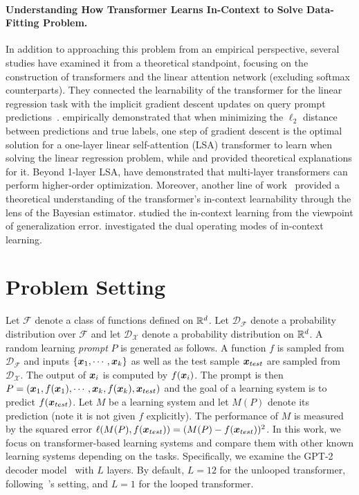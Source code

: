 \documentclass{article} %
\theoremstyle{plain}
\theoremstyle{definition}
\theoremstyle{remark}
\begin{document}
\paragraph{Understanding How Transformer Learns In-Context to Solve Data-Fitting Problem.}
 In addition to approaching this problem from an empirical perspective, several studies have examined it from a theoretical standpoint, focusing on the construction of transformers and the linear attention network (excluding softmax counterparts). They connected the learnability of the transformer for the linear regression task with the implicit gradient descent updates on query prompt predictions~\citep{Oswald2022TransformersLI, Ahn2023TransformersLT, Zhang2023TrainedTL, Mahankali2023OneSO, Ding2023CausalLMIN}. \citet{Oswald2022TransformersLI} empirically demonstrated that when minimizing the $\ell_2$ distance between predictions and true labels, one step of gradient descent is the optimal solution for a one-layer linear self-attention (LSA) transformer to learn when solving the linear regression problem, while \citet{Ahn2023TransformersLT, Zhang2023TrainedTL, zhang2024context} and \citet{Mahankali2023OneSO} provided theoretical explanations for it. Beyond 1-layer LSA, \citet{fu2023transformers, giannou2024well} have demonstrated that multi-layer transformers can perform higher-order optimization. Moreover, another line of work~\citep{Muller2021TransformersCD, Xie2021AnEO, Akyrek2022WhatLA, Bai2023TransformersAS} provided a theoretical understanding of the transformer's in-context learnability through the lens of the Bayesian estimator. \citet{Li2023TransformersAA} studied the in-context learning from the viewpoint of generalization error. \citet{lin2024dual} investigated the dual operating modes of in-context learning.

\section{Problem Setting}\label{sec:problem_setting}
Let $\mathcal{F}$ denote a class of functions defined on $\mathbb{R}^d$. Let $\mathcal{D}_{\mathcal{F}}$ denote a probability distribution over $\mathcal{F}$  and let $\mathcal{D}_{\mathcal{X}}$ denote a probability distribution on $\mathbb{R}^d$.  A random learning \emph{prompt} $P$ is generated as follows. A function $f$ is sampled from $\mathcal{D}_{\mathcal{F}}$ and inputs $\{{\bm{x}}_1, \cdots, {\bm{x}}_k\}$ as well as the test sample ${\bm{x}}_{test}$ are sampled from $\mathcal{D}_{\mathcal{X}}$.
The output of ${\bm{x}}_i$ is computed by $f({\bm{x}}_i)$.
The prompt is then $P=({\bm{x}}_1, f({\bm{x}}_1), \cdots, {\bm{x}}_k, f({\bm{x}}_k), {\bm{x}}_{test})$ and the goal of a learning system is to predict $f({\bm{x}}_{test})$. Let $M$ be a learning system and let $M(P)$ denote its prediction (note it is not given $f$ explicitly).  The performance of $M$ is measured  by the squared error 
$\ell(M(P), f({\bm{x}}_{test})) = (M(P) - f({\bm{x}}_{test}))^2$.  
In this work, we focus on transformer-based learning systems and compare them with other known learning systems depending on the tasks.
Specifically, we examine the GPT-2 decoder model~\citep{Radford2019LanguageMA} with $L$ layers. By default, $L=12$ for the unlooped transformer, following~\citet{Garg2022WhatCT}'s setting, and $L=1$ for the looped transformer.
\end{document}

